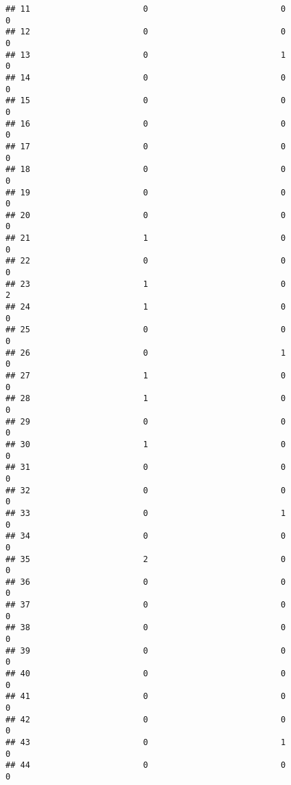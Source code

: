 \documentclass[
]{article}
\begin{document}
\begin{verbatim}
## 11                       0                           0                  0
## 12                       0                           0                  0
## 13                       0                           1                  0
## 14                       0                           0                  0
## 15                       0                           0                  0
## 16                       0                           0                  0
## 17                       0                           0                  0
## 18                       0                           0                  0
## 19                       0                           0                  0
## 20                       0                           0                  0
## 21                       1                           0                  0
## 22                       0                           0                  0
## 23                       1                           0                  2
## 24                       1                           0                  0
## 25                       0                           0                  0
## 26                       0                           1                  0
## 27                       1                           0                  0
## 28                       1                           0                  0
## 29                       0                           0                  0
## 30                       1                           0                  0
## 31                       0                           0                  0
## 32                       0                           0                  0
## 33                       0                           1                  0
## 34                       0                           0                  0
## 35                       2                           0                  0
## 36                       0                           0                  0
## 37                       0                           0                  0
## 38                       0                           0                  0
## 39                       0                           0                  0
## 40                       0                           0                  0
## 41                       0                           0                  0
## 42                       0                           0                  0
## 43                       0                           1                  0
## 44                       0                           0                  0

\end{verbatim}
\end{document}
